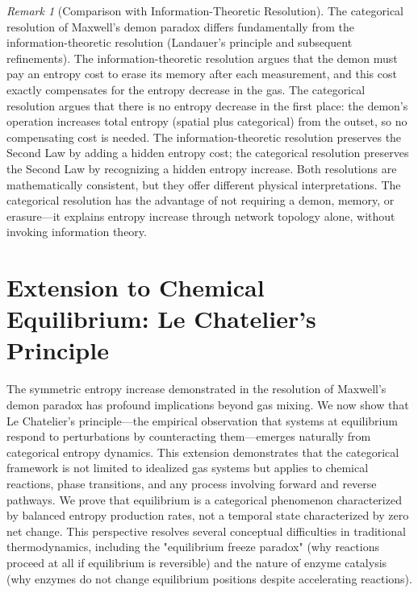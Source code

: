 \documentclass[12pt,a4paper]{article}
\theoremstyle{definition}
\theoremstyle{remark}
\newtheorem{remark}[theorem]{Remark}
\begin{document}
\begin{remark}[Comparison with Information-Theoretic Resolution]
\label{rem:comparison_information}
The categorical resolution of Maxwell's demon paradox differs fundamentally from the information-theoretic resolution (Landauer's principle and subsequent refinements). The information-theoretic resolution argues that the demon must pay an entropy cost to erase its memory after each measurement, and this cost exactly compensates for the entropy decrease in the gas. The categorical resolution argues that there is no entropy decrease in the first place: the demon's operation increases total entropy (spatial plus categorical) from the outset, so no compensating cost is needed. The information-theoretic resolution preserves the Second Law by adding a hidden entropy cost; the categorical resolution preserves the Second Law by recognizing a hidden entropy increase. Both resolutions are mathematically consistent, but they offer different physical interpretations. The categorical resolution has the advantage of not requiring a demon, memory, or erasure—it explains entropy increase through network topology alone, without invoking information theory.
\end{remark}

\section{Extension to Chemical Equilibrium: Le Chatelier's Principle}
\label{sec:lechatelier}

The symmetric entropy increase demonstrated in the resolution of Maxwell's demon paradox has profound implications beyond gas mixing. We now show that Le Chatelier's principle—the empirical observation that systems at equilibrium respond to perturbations by counteracting them—emerges naturally from categorical entropy dynamics. This extension demonstrates that the categorical framework is not limited to idealized gas systems but applies to chemical reactions, phase transitions, and any process involving forward and reverse pathways. We prove that equilibrium is a categorical phenomenon characterized by balanced entropy production rates, not a temporal state characterized by zero net change. This perspective resolves several conceptual difficulties in traditional thermodynamics, including the "equilibrium freeze paradox" (why reactions proceed at all if equilibrium is reversible) and the nature of enzyme catalysis (why enzymes do not change equilibrium positions despite accelerating reactions).
\end{document}
